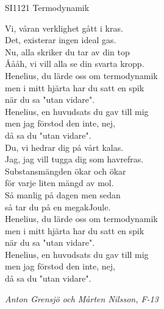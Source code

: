 \documentclass[a6paper,10pt]{article}
\begin{document}
\setlength{\oddsidemargin}{-0.47in}
\noindent
\begin{center}
\footnotesize SI1121 Termodynamik\\
\end{center}
Vi, våran verklighet gått i kras. \\
Det, existerar ingen ideal gas. \\
Nu, alla skriker du tar av din top \\
Åååh, vi vill alla se din svarta kropp.
\vspace{5pt} \\
Henelius, du lärde oss om termodynamik \\
men i mitt hjärta har du satt en spik \\
när du sa "utan vidare".
\vspace{5pt} \\
Henelius, en huvudsats du gav till mig \\
men jag förstod den inte, nej, \\
då sa du "utan vidare".
\vspace{5pt} \\
Du, vi hedrar dig på vårt kalas. \\
Jag, jag vill tugga dig som havrefras. \\
Substansmängden ökar och ökar \\
för varje liten mängd av mol.  \\
Så manlig på dagen men sedan \\
så tar du på en megakJoule.
\vspace{5pt} \\
Henelius, du lärde oss om termodynamik \\
men i mitt hjärta har du satt en spik \\
när du sa "utan vidare".
\vspace{5pt} \\
Henelius, en huvudsats du gav till mig \\
men jag förstod den inte, nej, \\
då sa du "utan vidare".
\begin{flushright}
\textit{Anton Grensjö och Mårten Nilsson, F-13}
\end{flushright}
\end{document}
